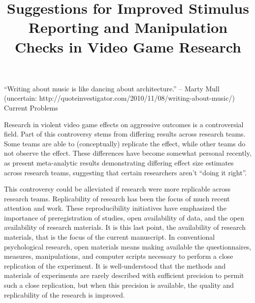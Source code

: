 
\title{Suggestions for Improved Stimulus Reporting and Manipulation Checks in Video Game Research}

 “Writing about music is like dancing about architecture.” – Marty Mull (uncertain: http://quoteinvestigator.com/2010/11/08/writing-about-music/)
Current Problems 

Research in violent video game effects on aggressive outcomes is a controversial field. Part of this controversy stems from differing results across research teams. Some teams are able to (conceptually) replicate the effect, while other teams do not observe the effect. These differences have become somewhat personal recently, as \citet{Greitemeyer:Mugge:2014} present meta-analytic results demonstrating differing effect size estimates across research teams, suggesting that certain researchers aren't ``doing it right''. %

This controversy could be alleviated if research were more replicable across research teams. Replicability of research has been the focus of much recent attention and work. These reproducibility initiatives have emphasized the importance of preregistration of studies, open availability of data, and the open availability of research materials. %
It is this last point, the availability of research materials, that is the focus of the current manuscript. In conventional psychological research, open materials means making available the questionnaires, measures, manipulations, and computer scripts necessary to perform a close replication of the experiment. It is well-understood that the methods and materials of experiments are rarely described with sufficient precision to permit such a close replication, but when this precision is available, the quality and replicability of the research is improved. 

